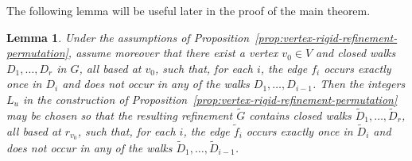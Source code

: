 \documentclass[a4paper,10pt]{amsart}
\theoremstyle{plain}
\newtheorem{lemma}[theorem]{Lemma}
\theoremstyle{definition}
\begin{document}
The following lemma will be useful later in the proof of the main theorem. 
\begin{lemma}\label{lem:triangular-walks-lift}
Under the assumptions of
Proposition~\ref{prop:vertex-rigid-refinement-permutation},
assume moreover that there exist a vertex $v_0\in V$ and closed walks
$D_1,\dots,D_r$ in $G$, all based at $v_0$, such that, for each $i$,
the edge $f_i$ occurs exactly once in $D_i$ and does not occur in any
of the walks $D_1,\dots,D_{i-1}$. Then the integers $L_u$ in the construction of
Proposition~\ref{prop:vertex-rigid-refinement-permutation} may be chosen
so that the resulting refinement $\widetilde G$ contains closed walks
$\widetilde D_1,\dots,\widetilde D_r$, all based at $r_{v_0}$, such
that, for each $i$, the edge $\widetilde f_i$ occurs exactly once in
$\widetilde D_i$ and does not occur in any of the walks
$\widetilde D_1,\dots,\widetilde D_{i-1}$.
\end{lemma}
\end{document}
